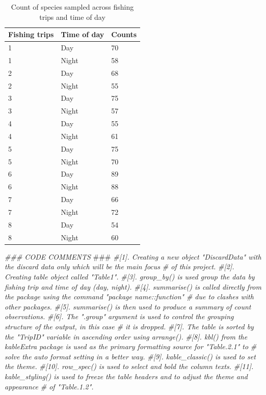 \documentclass[
]{book}
\newenvironment{Shaded}{\begin{snugshade}}{\end{snugshade}}
\newcommand{\AlertTok}[1]{\textcolor[rgb]{0.94,0.16,0.16}{#1}}
\newcommand{\CommentTok}[1]{\textcolor[rgb]{0.56,0.35,0.01}{\textit{#1}}}
\begin{document}
\begin{table}

\caption{\label{tab:unnamed-chunk-3}Count of species sampled across fishing trips and time of day}
\centering
\begin{tabular}[t]{l|l|l}
\hline
\textbf{Fishing trips} & \textbf{Time of day} & \textbf{Counts}\\
\hline
1 & Day & 70\\
\hline
1 & Night & 58\\
\hline
2 & Day & 68\\
\hline
2 & Night & 55\\
\hline
3 & Day & 75\\
\hline
3 & Night & 57\\
\hline
4 & Day & 55\\
\hline
4 & Night & 61\\
\hline
5 & Day & 75\\
\hline
5 & Night & 70\\
\hline
6 & Day & 89\\
\hline
6 & Night & 88\\
\hline
7 & Day & 66\\
\hline
7 & Night & 72\\
\hline
8 & Day & 54\\
\hline
8 & Night & 60\\
\hline
\end{tabular}
\end{table}

\begin{Shaded}
\begin{Highlighting}[]
\CommentTok{### CODE COMMENTS }\AlertTok{###}
\CommentTok{#[1]. Creating a new object "DiscardData" with the discard data only which will be the main focus}
\CommentTok{#     of this project.}
\CommentTok{#[2]. Creating table object called "Table1". }
\CommentTok{#[3]. group_by() is used group the data by fishing trip and time of day (day, night).}
\CommentTok{#[4]. summarise() is called directly from the package using the command "package name::function"}
\CommentTok{#     due to clashes with other packages.}
\CommentTok{#[5]. summarise() is then used to produce a summary of count observations. }
\CommentTok{#[6]. The ".group" argument is used to control the grouping structure of the output, in this case }
\CommentTok{#     it is dropped. }
\CommentTok{#[7]. The table is sorted by the "TripID" variable in ascending order using arrange().}
\CommentTok{#[8]. kbl() from the kableExtra package is used as the primary formatting source for "Table.2.1" to }
\CommentTok{#     solve the auto format setting in a better way.}
\CommentTok{#[9]. kable_classic() is used to set the theme. }
\CommentTok{#[10]. row_spec() is used to select and bold the column texts.}
\CommentTok{#[11]. kable_styling() is used to freeze the table headers and to adjust the theme and appearance }
\CommentTok{#     of "Table.1.2".}
\end{Highlighting}
\end{Shaded}
\end{document}
